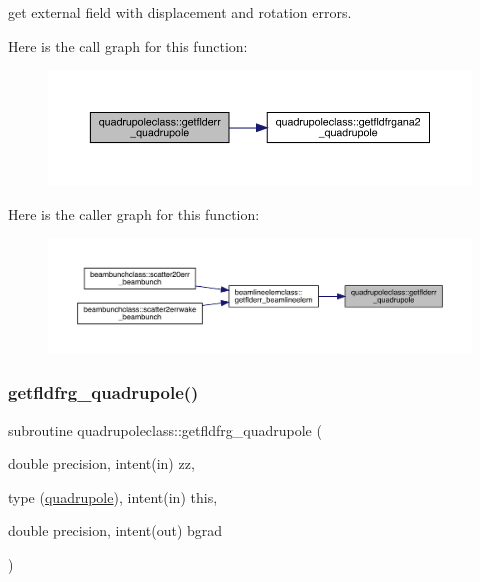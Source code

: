 get external field with displacement and rotation errors. 

Here is the call graph for this function\+:\nopagebreak
\begin{figure}[H]
\begin{center}
\leavevmode
\includegraphics[width=350pt]{namespacequadrupoleclass_a41791f03ec33f0255e54ebc7b9519170_cgraph}
\end{center}
\end{figure}
Here is the caller graph for this function\+:\nopagebreak
\begin{figure}[H]
\begin{center}
\leavevmode
\includegraphics[width=350pt]{namespacequadrupoleclass_a41791f03ec33f0255e54ebc7b9519170_icgraph}
\end{center}
\end{figure}
\mbox{\label{namespacequadrupoleclass_a28a961157d94669d59f8c6f024995899}} 
\subsubsection{\texorpdfstring{getfldfrg\_quadrupole()}{getfldfrg\_quadrupole()}}
{\footnotesize\ttfamily subroutine quadrupoleclass\+::getfldfrg\+\_\+quadrupole (\begin{DoxyParamCaption}\item[{double precision, intent(in)}]{zz,  }\item[{type (\mbox{\hyperlink{namespacequadrupoleclass_structquadrupoleclass_1_1quadrupole}{quadrupole}}), intent(in)}]{this,  }\item[{double precision, intent(out)}]{bgrad }\end{DoxyParamCaption})}




